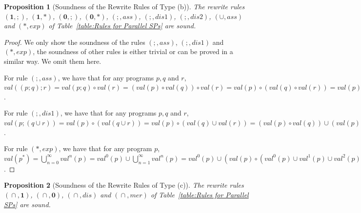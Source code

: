 \documentclass{fcs}
\newtheorem{prop}{Proposition}[section]
\newcommand{\noth}[0]{\mathbf{1}}
\newcommand{\halt}[0]{\mathbf{0}}
\newcommand{\val}[0]{\mathit{val}}
\DeclareMathOperator{\seq}{;}
\DeclareMathOperator{\para}{\cap}
\begin{document}
\begin{prop}[Soundness of the Rewrite Rules of Type (b)]
    \label{prop:Soundness of the Rewrite Rules for Closed Sequential Programs}
    The rewrite rules $(\noth,\seq)$, $(\noth,*)$, $(\halt,\seq)$, $(\halt,*)$, $(\seq, \mathit{ass})$, $(\seq,\mathit{dis}1)$, $(\seq, \mathit{dis}2)$, $(\cup, \mathit{ass})$ and $(*,\mathit{exp})$ of Table~\ref{table:Rules for Parallel SPs} are sound.
\end{prop}

\begin{proof}
    We only show the soundness of the rules $(\seq,\mathit{ass})$, $(\seq, \mathit{dis}1)$ and $(*, \mathit{exp})$, the soundness of other rules is either trivial or can be proved in a similar way. We omit them here.

    For rule $(\seq,\mathit{ass})$, we have that for any programs $p, q$ and $r$, $\val((p;q);r) = \val(p;q)\circ \val(r) =(\val(p)\circ \val(q))\circ \val(r) = \val(p)\circ (\val(q)\circ \val(r)) = \val(p)\circ \val(q;r) = \val(p;(q;r))$.

    For rule $(\seq, \mathit{dis}1)$, we have that for any programs $p,q$ and $r$, $\val(p;(q\cup r)) = \val(p)\circ (\val(q\cup r)) = \val(p)\circ (\val(q)\cup \val(r)) = (\val(p)\circ \val(q))\cup (\val(p)\circ \val(r)) = \val(p;q)\cup \val(p;r) = \val(p;q\cup p;r)$.

    For rule $(*,\mathit{exp})$, we have that for any program $p$,
    $\val(p^*) = \bigcup^{\infty}_{n=0}\val^n(p) = \val^0(p) \cup \bigcup^{\infty}_{n=1}\val^n(p) = \val^0(p)\cup (\val(p)\circ (\val^0(p)\cup \val^1(p)\cup \val^2(p) \cup ... )) = \val^0(p)\cup (\val(p)\circ \bigcup^{\infty}_{n=0}\val^n(p)) = \val(\noth)\cup \val(p)\circ \val(p^*) = \val(\noth\cup p\seq p^*)$.
\end{proof}

\begin{prop}[Soundness of the Rewrite Rules of Type (c)]
    \label{prop:Soundness of the Rewrite Rules for Parallel Programs}
    The rewrite rules $(\para, \noth)$, $(\para, \halt)$, $(\para, \mathit{dis})$ and $(\para, \mathit{mer})$ of Table~\ref{table:Rules for Parallel SPs} are sound.
\end{prop}
\end{document}

